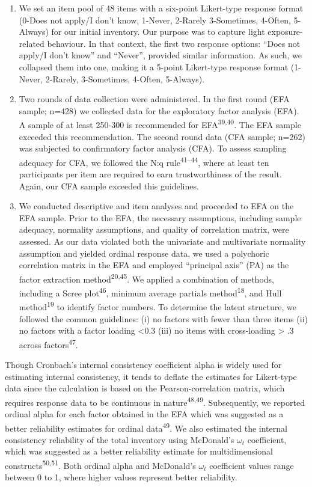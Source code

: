 \documentclass[
  man]{apa6}
\begin{document}
\begin{enumerate}
\def\labelenumi{(\arabic{enumi})}
\item
  We set an item pool of 48 items with a six-point Likert-type response format (0-Does not apply/I don't know, 1-Never, 2-Rarely 3-Sometimes, 4-Often, 5-Always) for our initial inventory. Our purpose was to capture light exposure-related behaviour. In that context, the first two response options: ``Does not apply/I don't know'' and ``Never'', provided similar information. As such, we collapsed them into one, making it a 5-point Likert-type response format (1-Never, 2-Rarely, 3-Sometimes, 4-Often, 5-Always).
\item
  Two rounds of data collection were administered. In the first round (EFA sample; n=428) we collected data for the exploratory factor analysis (EFA). A sample of at least 250-300 is recommended for EFA\textsuperscript{39,40}. The EFA sample exceeded this recommendation. The second round data (CFA sample; n=262) was subjected to confirmatory factor analysis (CFA). To assess sampling adequacy for CFA, we followed the N:q rule\textsuperscript{41--44}, where at least ten participants per item are required to earn trustworthiness of the result. Again, our CFA sample exceeded this guidelines.
\item
  We conducted descriptive and item analyses and proceeded to EFA on the EFA sample. Prior to the EFA, the necessary assumptions, including sample adequacy, normality assumptions, and quality of correlation matrix, were assessed. As our data violated both the univariate and multivariate normality assumption and yielded ordinal response data, we used a polychoric correlation matrix in the EFA and employed ``principal axis'' (PA) as the factor extraction method\textsuperscript{20,45}. We applied a combination of methods, including a Scree plot\textsuperscript{46}, minimum average partials method\textsuperscript{18}, and Hull method\textsuperscript{19} to identify factor numbers. To determine the latent structure, we followed the common guidelines: (i) no factors with fewer than three items (ii) no factors with a factor loading \textless0.3 (iii) no items with cross-loading \textgreater{} .3 across factors\textsuperscript{47}.
\end{enumerate}

Though Cronbach's internal consistency coefficient alpha is widely used for estimating internal consistency, it tends to deflate the estimates for Likert-type data since the calculation is based on the Pearson-correlation matrix, which requires response data to be continuous in nature\textsuperscript{48,49}. Subsequently, we reported ordinal alpha for each factor obtained in the EFA which was suggested as a better reliability estimates for ordinal data\textsuperscript{49}. We also estimated the internal consistency reliability of the total inventory using McDonald's \(\omega_t\) coefficient, which was suggested as a better reliability estimate for multidimensional constructs\textsuperscript{50,51}. Both ordinal alpha and McDonald's \(\omega_t\) coefficient values range between 0 to 1, where higher values represent better reliability.
\end{document}
